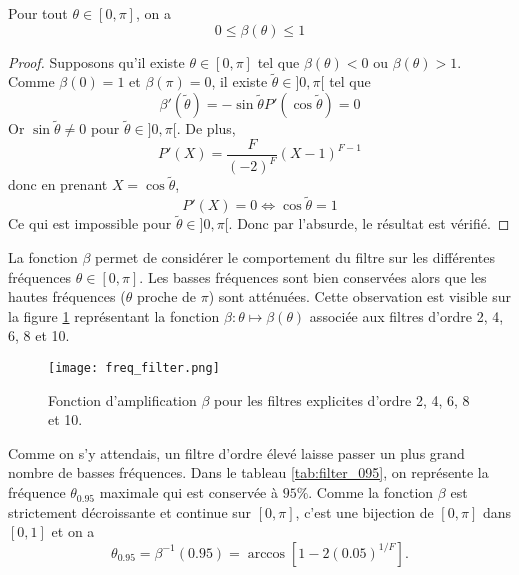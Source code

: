 \begin{proposition}
Pour tout $\theta \in [0, \pi]$, on a 
\begin{equation}
0 \leq \beta ( \theta ) \leq 1
\end{equation}
\end{proposition}

\begin{proof}
Supposons qu'il existe $\theta \in [0, \pi]$ tel que $\beta(\theta) < 0$ ou $\beta(\theta) > 1$. Comme $\beta(0)=1$ et $\beta(\pi) = 0$, il existe $\tilde{\theta} \in ]0, \pi[$ tel que 
\begin{equation}
\beta'(\tilde{\theta}) = - \sin \tilde{\theta} P'(\cos \tilde{\theta} ) = 0
\end{equation}
Or $\sin \tilde{\theta} \neq 0$ pour $\tilde{\theta} \in ]0, \pi[$.
De plus, 
\begin{equation}
P'(X) = \dfrac{F}{(-2)^F}(X-1)^{F-1}
\end{equation}
donc en prenant $X = \cos \tilde{\theta}$,
\begin{equation*}
P'(X) = 0 \Leftrightarrow \cos \tilde{\theta} = 1
\end{equation*}
Ce qui est impossible pour $\tilde{\theta} \in ]0, \pi[$. Donc par l'absurde, le résultat est vérifié.
\end{proof}

La fonction $\beta$ permet de considérer le comportement du filtre sur les différentes fréquences $\theta \in [0, \pi]$. Les basses fréquences sont bien conservées alors que les hautes fréquences ($\theta$ proche de $\pi$) sont atténuées. Cette observation est visible sur la figure \ref{fig:freq_filter} représentant la fonction $\beta : \theta \mapsto \beta(\theta)$ associée aux filtres d'ordre 2, 4, 6, 8 et 10. 

\begin{figure}[htbp]
\begin{center}
\texttt{[image: freq\_filter.png]}
\end{center}
\caption{Fonction d'amplification $\beta$ pour les filtres explicites d'ordre 2, 4, 6, 8 et 10.}
\label{fig:freq_filter}
\end{figure}
Comme on s'y attendais, un filtre d'ordre élevé laisse passer un plus grand nombre de basses fréquences. Dans le tableau \ref{tab:filter_095}, on représente la fréquence $\theta_{0.95}$ maximale qui est conservée à $95\%$. Comme la fonction $\beta$ est strictement décroissante et continue sur $[0,\pi]$, c'est une bijection de $[0,\pi]$ dans $[0,1]$ et on a 
\begin{equation}
\theta_{0.95} = \beta^{-1}(0.95)= \arccos \left[ 1-2 (0.05)^{1/F} \right].
\end{equation}


